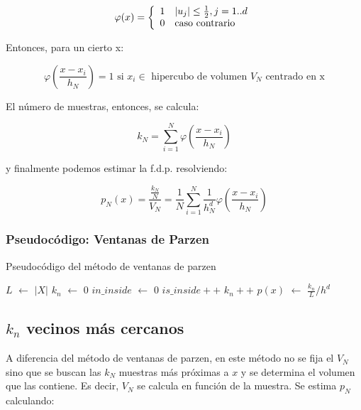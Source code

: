 \[ \varphi(x) = \left\{
\begin{array}{c l}
  1 & |u_j| \leq \frac{1}{2}, j=1..d \\
  0 & \text{caso contrario}
\end{array}
\right.
\]

Entonces, para un cierto x:

\[ \varphi(\frac{x-x_i}{h_N}) = 1 \text{ si } x_i \in \text{ hipercubo de volumen } V_N \text{ centrado en x} \]

El número de muestras, entonces, se calcula:

\[k_N = \sum_{i=1}^{N} \varphi(\frac{x-x_i}{h_N}) \]

y finalmente podemos estimar la f.d.p. resolviendo:

\begin{equation}
p_N(x) = \frac{\frac{k_N}{N}}{V_N} = \frac{1}{N} \sum_{i=1}^{N} \frac{1}{h_{N}^{d}} \varphi(\frac{x-x_i}{h_N})
\end{equation}

\subsubsection{Pseudocódigo: Ventanas de Parzen}

\begin{algorithm}[H]
  \begin{algorithmic}[1]
  \caption{Pseudocódigo del método de ventanas de parzen}
  \label{algo:3-1}
	\State $L$ $\gets$ $|X|$
	\State $k_n$ $\gets$ $0$
		\State $in\_inside$ $\gets$ $0$
				\State $is\_inside++$
			\EndIf
		\EndFor
			\State $k_n++$
		\EndIf
	\EndFor
	\State $p(x)$ $\gets$ $\frac{k_n}{L} / h^d$
	\EndProcedure
	\end{algorithmic}
\end{algorithm}

\subsection{$k_n$ vecinos más cercanos}

A diferencia del método de ventanas de parzen, en este método no se fija el $V_N$ sino que se buscan las $k_N$ muestras más próximas a $x$ y se determina el volumen que las contiene. Es decir, $V_N$ se calcula en función de la muestra. Se estima $p_N$ calculando:

